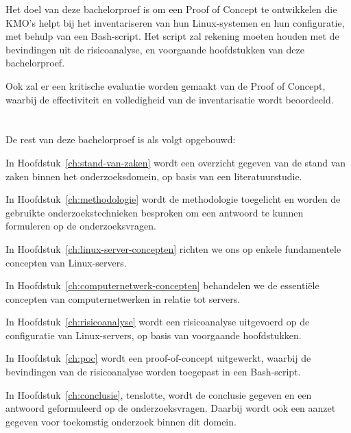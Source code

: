 Het doel van deze bachelorproef is om een Proof of Concept te ontwikkelen die KMO's helpt bij het inventariseren van hun Linux-systemen en hun configuratie, met behulp van een Bash-script.
Het script zal rekening moeten houden met de bevindingen uit de risicoanalyse, en voorgaande hoofdstukken van deze bachelorproef.

Ook zal er een kritische evaluatie worden gemaakt van de Proof of Concept, waarbij de effectiviteit en volledigheid van de inventarisatie wordt beoordeeld.

\section{}%
\label{sec:opzet-bachelorproef}


De rest van deze bachelorproef is als volgt opgebouwd:

In Hoofdstuk~\ref{ch:stand-van-zaken} wordt een overzicht gegeven van de stand van zaken binnen het onderzoeksdomein, op basis van een literatuurstudie.

In Hoofdstuk~\ref{ch:methodologie} wordt de methodologie toegelicht en worden de gebruikte onderzoekstechnieken besproken om een antwoord te kunnen formuleren op de onderzoeksvragen.

In Hoofdstuk~\ref{ch:linux-server-concepten} richten we ons op enkele fundamentele concepten van Linux-servers.

In Hoofdstuk~\ref{ch:computernetwerk-concepten} behandelen we de essenti\"ele concepten van computernetwerken in relatie tot servers.

In Hoofdstuk~\ref{ch:risicoanalyse} wordt een risicoanalyse uitgevoerd op de configuratie van Linux-servers, op basis van voorgaande hoofdstukken.

In Hoofdstuk~\ref{ch:poc} wordt een proof-of-concept uitgewerkt, waarbij de bevindingen van de risicoanalyse worden toegepast in een Bash-script.

In Hoofdstuk~\ref{ch:conclusie}, tenslotte, wordt de conclusie gegeven en een antwoord geformuleerd op de onderzoeksvragen. Daarbij wordt ook een aanzet gegeven voor toekomstig onderzoek binnen dit domein.
